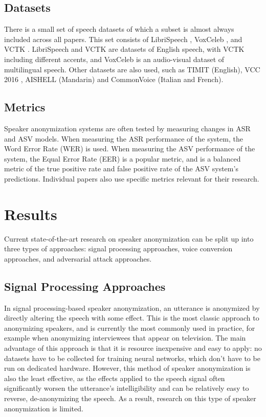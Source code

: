 \documentclass{Interspeech2024}
\begin{document}
\subsection{Datasets}
There is a small set of speech datasets of which a subset is almost always included across all papers.
This set consists of LibriSpeech \cite{panayotov_2015_librispeech}, VoxCeleb \cite{nagrani_2017_voxceleb,chung_2018_voxceleb2}, and VCTK \cite{yamagishi_2019_vctk}.
LibriSpeech and VCTK are datasets of English speech, with VCTK including different accents, and VoxCeleb is an audio-visual dataset of multilingual speech.
Other datasets are also used, such as TIMIT \cite{garofolo_1993_timit} (English), VCC 2016 \cite{toda_2016_vcc}, AISHELL \cite{bu_2017_aishell} (Mandarin) and CommonVoice \cite{ardila_2020_commonvoice} (Italian and French).

\subsection{Metrics}
Speaker anonymization systems are often tested by measuring changes in ASR and ASV models.
When measuring the ASR performance of the system, the Word Error Rate (WER) is used.
When measuring the ASV performance of the system, the Equal Error Rate (EER) is a popular metric, and is a balanced metric of the true positive rate and false positive rate of the ASV system's predictions.
Individual papers also use specific metrics relevant for their research.


\section{Results}
Current state-of-the-art research on speaker anonymization can be split up into three types of approaches: signal processing approaches, voice conversion approaches, and adversarial attack approaches.

\subsection{Signal Processing Approaches}
In signal processing-based speaker anonymization, an utterance is anonymized by directly altering the speech with some effect.
This is the most classic approach to anonymizing speakers, and is currently the most commonly used in practice, for example when anonymizing interviewees that appear on television.
The main advantage of this approach is that it is resource inexpensive and easy to apply: no datasets have to be collected for training neural networks, which don't have to be run on dedicated hardware.
However, this method of speaker anonymization is also the least effective, as the effects applied to the speech signal often significantly worsen the utterance's intelligibility and can be relatively easy to reverse, de-anonymizing the speech.
As a result, research on this type of speaker anonymization is limited.
\end{document}

